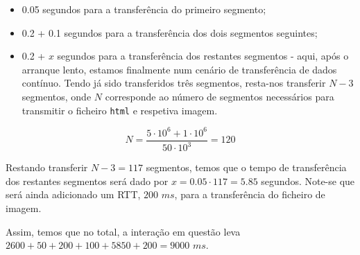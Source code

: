 \begin{enumerate}[leftmargin=\labelsep]
        \begin{itemize}
          \item 0.05 segundos para a transferência do primeiro segmento;
          \item 0.2 + 0.1 segundos para a transferência dos dois segmentos seguintes;
          \item 0.2 + $x$ segundos para a transferência dos restantes segmentos - aqui, após
                o arranque lento, estamos finalmente num cenário de transferência de dados
                contínuo. Tendo já sido transferidos três segmentos, resta-nos transferir $N-3$ segmentos,
                onde $N$ corresponde ao número de segmentos necessários para transmitir
                o ficheiro \texttt{html} e respetiva imagem.
        \end{itemize}


        $$
          N = \frac{5 \cdot 10^6 + 1 \cdot 10^6}{50 \cdot 10^3} = 120
        $$

        Restando transferir $N-3 = 117$ segmentos, temos que o tempo de transferência dos restantes
        segmentos será dado por $x = 0.05 \cdot 117 = 5.85$ segundos. Note-se que será ainda
        adicionado um RTT, $200$ $ms$, para a transferência do ficheiro de imagem.

        Assim, temos que no total, a interação em questão leva $2600 + 50 + 200 + 100 + 5850 + 200 = 9000$ $ms$.

\end{enumerate}